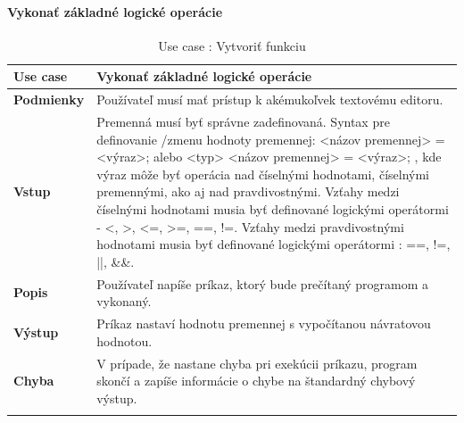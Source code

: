 \paragraph{Vykonať základné logické operácie}
\begin{center}
	\begin{longtable}{|p{2.5cm}|p{12.2cm}|}
		
			\hline
			\textbf{Use case} & Vykonať základné logické operácie\\ 
			\hline
			\textbf{Podmienky} & Používateľ musí mať prístup k akémukoľvek textovému editoru.  \\ 
			\hline
			\textbf{Vstup} & Premenná musí byť správne zadefinovaná. \newline
			Syntax pre definovanie /zmenu hodnoty premennej:  \newline
			<názov premennej> = <výraz>; alebo \newline
			<typ> <názov premennej> = <výraz>;
			\newline
			, kde výraz môže byť operácia nad číselnými hodnotami, číselnými premennými, ako aj nad pravdivostnými.\newline
			Vzťahy medzi číselnými hodnotami musia byť definované logickými operátormi - <, >, <=, >=, ==, !=.\newline
			Vzťahy medzi pravdivostnými hodnotami musia byť definované logickými operátormi : ==, !=, ||, \&\&.  \\
			\hline
			\textbf{Popis} & Používateľ napíše príkaz, ktorý bude prečítaný programom a vykonaný.\\ 
			\hline
			\textbf{Výstup} & Príkaz nastaví hodnotu premennej s vypočítanou návratovou hodnotou.\\
			\hline
			\textbf{Chyba} & V prípade, že nastane chyba pri exekúcii príkazu, program skončí a zapíše informácie o chybe na štandardný chybový výstup.\\
			\hline
		\caption{Use case : Vytvoriť funkciu}
		\label{table:1}
		
	\end{longtable}
\end{center}

